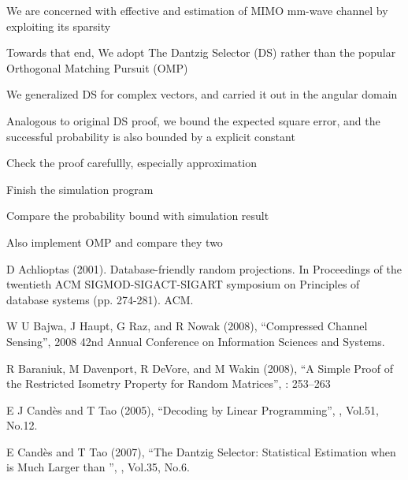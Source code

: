 {
\I We are concerned with effective and estimation of MIMO mm-wave channel by exploiting its sparsity

\I Towards that end, We adopt The Dantzig Selector (DS) rather than the popular Orthogonal Matching Pursuit (OMP)

\I We generalized DS for complex vectors, and carried it out in the angular domain

\I Analogous to original DS proof, we bound the expected square error, and the successful probability is also bounded by a explicit constant
}
{
\I Check the proof carefullly, especially approximation

\I Finish the simulation program

\I Compare the probability bound with simulation result

\I Also implement OMP and compare they two
}
{
{\tfxx
\I D Achlioptas (2001). Database-friendly random projections. In Proceedings of the twentieth ACM SIGMOD-SIGACT-SIGART symposium on Principles of database systems (pp. 274-281). ACM.

\I W U Bajwa, J Haupt, G Raz, and R Nowak (2008), ``Compressed Channel Sensing'', 2008 42nd Annual Conference on Information Sciences and Systems.

\I R Baraniuk, M Davenport, R DeVore, and M Wakin (2008), ``A Simple Proof of the Restricted Isometry Property for Random Matrices'',  : 253–263

\I E J Cand\`es and T Tao (2005), ``Decoding by Linear Programming'', , Vol.51, No.12.

\I E Cand\`es and T Tao (2007), ``The Dantzig Selector: Statistical Estimation when  is Much Larger than '', , Vol.35, No.6.
}
}

